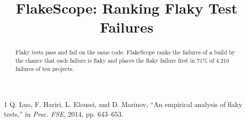 \documentclass[conference]{IEEEtran}
\begin{document}
\title{FlakeScope: Ranking Flaky Test Failures}
\author{}
\maketitle
\begin{abstract}
Flaky tests pass and fail on the same code. FlakeScope ranks the failures of a build by the chance that each
failure is flaky and places the flaky failure first in 71\% of 4,210 failures of ten projects.
\end{abstract}

\begin{thebibliography}{1}
 Q. Luo, F. Hariri, L. Eloussi, and D. Marinov, ``An empirical analysis of flaky tests,'' in
\emph{Proc. FSE}, 2014, pp. 643--653.
\end{thebibliography}
\end{document}
